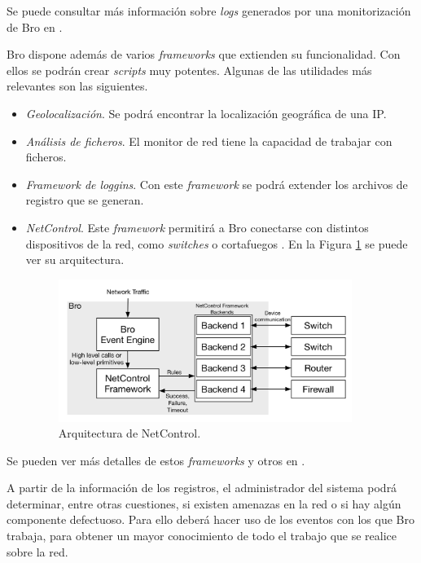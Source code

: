 \intro Se puede consultar más información sobre \textit{logs} generados por una monitorización de Bro en \cite{brologs}.

\intro Bro dispone además de varios \textit{frameworks} que extienden su funcionalidad. Con ellos se podrán crear \textit{scripts} muy 
potentes. Algunas de las utilidades más relevantes son las siguientes.
\begin{itemize}\label{sub.framew}
\item \textit{Geolocalización}. Se podrá encontrar la localización geográfica de una IP.
\item \textit{Análisis de ficheros}. El monitor de red tiene la capacidad de trabajar con ficheros.
\item \textit{Framework de loggins}. Con este \textit{framework} se podrá extender los archivos de registro que se generan.
\item \textit{NetControl}. Este \textit{framework} permitirá a Bro conectarse con distintos dispositivos de la red, como 
\textit{switches} o cortafuegos \cite{bronetcontrol}. En la Figura \ref{fig.netcontrol} se puede ver su arquitectura.
\begin{figure}[H]
  \includegraphics[width=0.9\textwidth]{imagenes/netcarquitectura.png}
  \centering
  \caption{Arquitectura de NetControl.}\label{fig.netcontrol}
\end{figure}
\end{itemize}

\intro Se pueden ver más detalles de estos \textit{frameworks} y otros en \cite{broframeworks}.

\intro A partir de la información de los registros, el administrador del sistema podrá determinar, entre otras cuestiones, si existen 
amenazas en la red o si hay algún componente defectuoso. Para ello deberá hacer uso de los eventos con los que Bro trabaja, para 
obtener un mayor conocimiento de todo el trabajo que se realice sobre la red.

